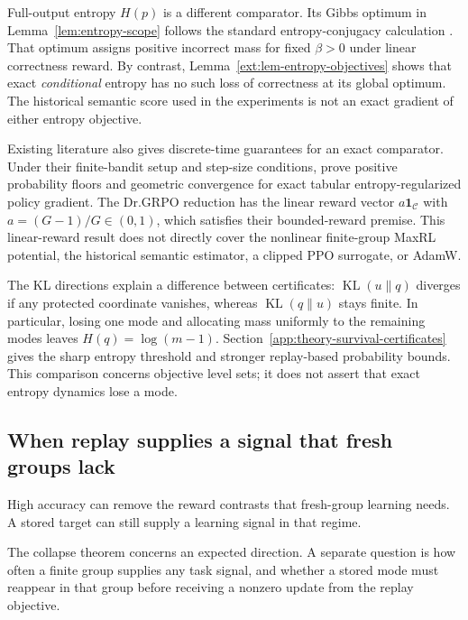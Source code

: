 Full-output entropy $H(p)$ is a different comparator. Its Gibbs optimum in
Lemma~\ref{lem:entropy-scope} follows the standard entropy-conjugacy
calculation \citep[Section~2.2]{geist2019regmdp}. That optimum assigns positive
incorrect mass for fixed $\beta>0$ under linear correctness reward. By
contrast, Lemma~\ref{ext:lem-entropy-objectives} shows that exact
\emph{conditional} entropy has no such loss of correctness at its global
optimum. The historical semantic score used in the experiments is not an
exact gradient of either entropy objective.

Existing literature also gives discrete-time guarantees for an exact
comparator. Under their finite-bandit setup and step-size conditions,
\citet[Lemma~13 and Theorem~5]{mei2020softmaxpg} prove positive
probability floors and geometric convergence for exact tabular
entropy-regularized policy gradient. The Dr.GRPO reduction has the linear
reward vector $a\mathbf 1_{\mathcal C}$ with $a=(G-1)/G\in(0,1)$, which
satisfies their bounded-reward premise. This linear-reward result does not
directly cover the nonlinear finite-group MaxRL potential, the historical
semantic estimator, a clipped PPO surrogate, or AdamW.

The KL directions explain a difference between certificates:
$\operatorname{KL}(u\|q)$ diverges if any protected coordinate vanishes,
whereas $\operatorname{KL}(q\|u)$ stays finite. In particular, losing one
mode and allocating mass uniformly to the remaining modes leaves
$H(q)=\log(m-1)$. Section~\ref{app:theory-survival-certificates} gives the
sharp entropy threshold and stronger replay-based probability bounds.
This comparison concerns objective level sets; it does not assert that exact
entropy dynamics lose a mode.

\subsection{When replay supplies a signal that fresh groups lack}
\label{app:theory-gradient-availability}

High accuracy can remove the reward contrasts that fresh-group learning
needs. A stored target can still supply a learning signal in that regime.


The collapse theorem concerns an expected direction. A separate question is
how often a finite group supplies any task signal, and whether a stored mode
must reappear in that group before receiving a nonzero update from the replay objective.

